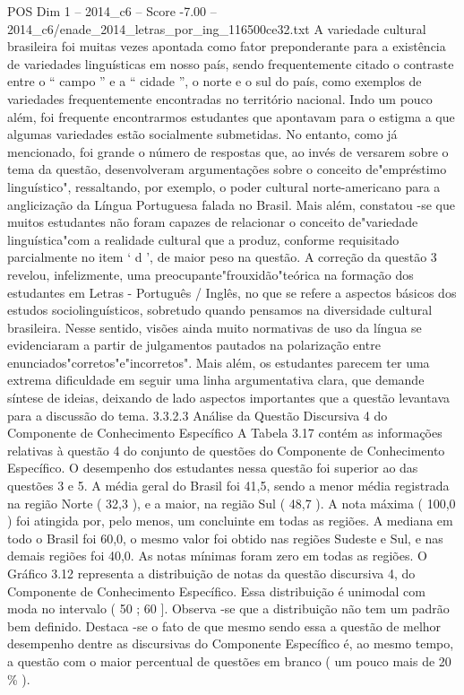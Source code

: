\begin{textsample}{POS Dim 1 – 2014\_c6 – Score -7.00 – 2014\_c6/enade\_2014\_letras\_por\_ing\_116500ce32.txt}
A variedade cultural brasileira foi muitas vezes apontada como fator preponderante para a existência de variedades linguísticas em nosso país, sendo frequentemente citado o contraste entre o “ campo ” e a “ cidade ”, o norte e o sul do país, como exemplos de variedades frequentemente encontradas no território nacional.
Indo um pouco além, foi frequente encontrarmos estudantes que apontavam para o estigma a que algumas variedades estão socialmente submetidas.
No entanto, como já mencionado, foi grande o número de respostas que, ao invés de versarem sobre o tema da questão, desenvolveram argumentações sobre o conceito de"empréstimo linguístico", ressaltando, por exemplo, o poder cultural norte-americano para a anglicização da Língua Portuguesa falada no Brasil.
Mais além, constatou -se que muitos estudantes não foram capazes de relacionar o conceito de"variedade linguística"com a realidade cultural que a produz, conforme requisitado parcialmente no item ‘ d ’, de maior peso na questão.
A correção da questão 3 revelou, infelizmente, uma preocupante"frouxidão"teórica na formação dos estudantes em Letras - Português / Inglês, no que se refere a aspectos básicos dos estudos sociolinguísticos, sobretudo quando pensamos na diversidade cultural brasileira.
Nesse sentido, visões ainda muito normativas de uso da língua se evidenciaram a partir de julgamentos pautados na polarização entre enunciados"corretos"e"incorretos".
Mais além, os estudantes parecem ter uma extrema dificuldade em seguir uma linha argumentativa clara, que demande síntese de ideias, deixando de lado aspectos importantes que a questão levantava para a discussão do tema. 3.3.2.3 Análise da Questão Discursiva 4 do Componente de Conhecimento Específico A Tabela 3.17 contém as informações relativas à questão 4 do conjunto de questões do Componente de Conhecimento Específico.
O desempenho dos estudantes nessa questão foi superior ao das questões 3 e 5.
A média geral do Brasil foi 41,5, sendo a menor média registrada na região Norte ( 32,3 ), e a maior, na região Sul ( 48,7 ).
A nota máxima ( 100,0 ) foi atingida por, pelo menos, um concluinte em todas as regiões.
A mediana em todo o Brasil foi 60,0, o mesmo valor foi obtido nas regiões Sudeste e Sul, e nas demais regiões foi 40,0.
As notas mínimas foram zero em todas as regiões.
O Gráfico 3.12 representa a distribuição de notas da questão discursiva 4, do Componente de Conhecimento Específico.
Essa distribuição é unimodal com moda no intervalo ( 50 ; 60 ].
Observa -se que a distribuição não tem um padrão bem definido.
Destaca -se o fato de que mesmo sendo essa a questão de melhor desempenho dentre as discursivas do Componente Específico é, ao mesmo tempo, a questão com o maior percentual de questões em branco ( um pouco mais de 20 \% ).

\end{textsample}
